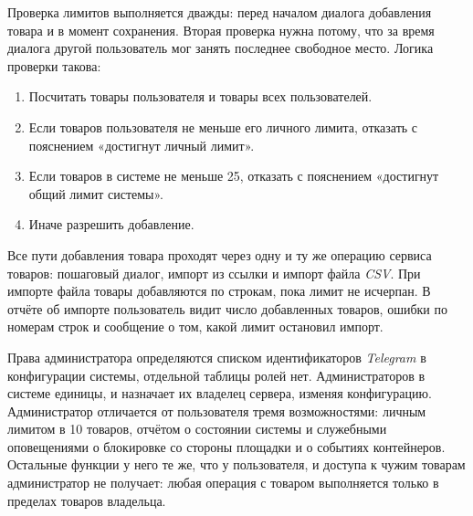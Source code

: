 Проверка лимитов выполняется дважды: перед началом диалога добавления товара и в момент сохранения. Вторая проверка нужна потому, что за время диалога другой пользователь мог занять последнее свободное место. Логика проверки такова:
\begin{enumerate}
	\item Посчитать товары пользователя и товары всех пользователей.
	\item Если товаров пользователя не меньше его личного лимита, отказать с пояснением «достигнут личный лимит».
	\item Если товаров в системе не меньше 25, отказать с пояснением «достигнут общий лимит системы».
	\item Иначе разрешить добавление.
\end{enumerate}

Все пути добавления товара проходят через одну и ту же операцию сервиса товаров: пошаговый диалог, импорт из ссылки и импорт файла \textit{CSV}. При импорте файла товары добавляются по строкам, пока лимит не исчерпан. В отчёте об импорте пользователь видит число добавленных товаров, ошибки по номерам строк и сообщение о том, какой лимит остановил импорт.

Права администратора определяются списком идентификаторов \textit{Telegram} в конфигурации системы, отдельной таблицы ролей нет. Администраторов в системе единицы, и назначает их владелец сервера, изменяя конфигурацию. Администратор отличается от пользователя тремя возможностями: личным лимитом в 10 товаров, отчётом о состоянии системы и служебными оповещениями о блокировке со стороны площадки и о событиях контейнеров. Остальные функции у него те же, что у пользователя, и доступа к чужим товарам администратор не получает: любая операция с товаром выполняется только в пределах товаров владельца.

